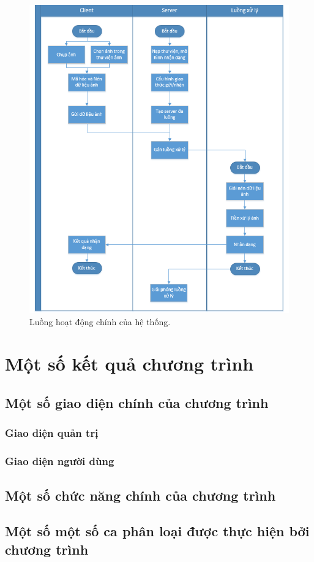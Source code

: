 \begin{figure}[H]
	\centering
	\includegraphics[width=0.88\linewidth]{images/app_sequence}
	\caption{Luồng hoạt động chính của hệ thống.}
	\label{fig:app_sequence}
\end{figure}

\section{Một số kết quả chương trình}
\subsection{Một số giao diện chính của chương trình}
\subsubsection{Giao diện quản trị}

\subsubsection{Giao diện người dùng}

\subsection{Một số chức năng chính của chương trình}

\subsection{Một số một số ca phân loại được thực hiện bởi chương trình}

